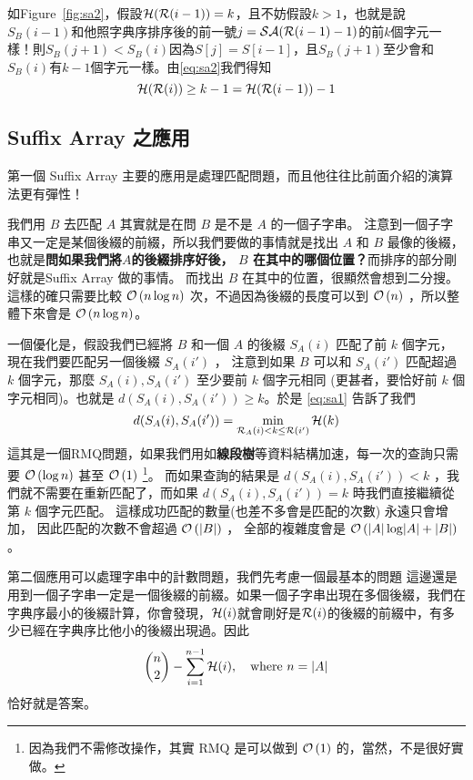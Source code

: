 \documentclass[a4paper,12pt]{book}
\begin{document}
如Figure~\ref{fig:sa2}，假設$\operatorname{\mathcal{H}}(\operatorname{\mathcal{R}}(i-1)) = k$，且不妨假設$k > 1$，也就是說$S_{B}(i-1)$和他照字典序排序後的前一號$j = \operatorname{\mathcal{SA}}(\operatorname{\mathcal{R}}(i-1)-1)$的前$k$個字元一樣！則$S_B(j+1) < S_B(i)$因為$S[j] = S[i-1]$，且$S_B(j+1)$至少會和$S_B(i)$有$k-1$個字元一樣。由\eqref{eq:sa2}我們得知
\[
  \operatorname{\mathcal{H}}(\operatorname{\mathcal{R}}(i)) \geq k - 1 = \operatorname{\mathcal{H}}(\operatorname{\mathcal{R}}(i-1)) - 1 
\]

\subsection{Suffix Array 之應用}
第一個 Suffix Array 主要的應用是處理匹配問題，而且他往往比前面介紹的演算法更有彈性！ 

我們用 $B$ 去匹配 $A$ 其實就是在問 $B$ 是不是 $A$ 的一個子字串。 注意到一個子字串又一定是某個後綴的前綴，所以我們要做的事情就是找出 $A$ 和 $B$ 最像的後綴，也就是{\bf 問如果我們將$A$的後綴排序好後， $B$ 在其中的哪個位置？}而排序的部分剛好就是Suffix Array 做的事情。 而找出 $B$ 在其中的位置，很顯然會想到二分搜。 這樣的確只需要比較 $\operatorname{\mathcal{O}}\left(n \log n\right)$ 次，不過因為後綴的長度可以到 $\operatorname{\mathcal{O}}\left(n\right)$ ，所以整體下來會是 $\operatorname{\mathcal{O}}\left(n \log n\right)$。

一個優化是，假設我們已經將 $B$ 和一個 $A$ 的後綴 $S_A(i)$ 匹配了前 $k$ 個字元， 現在我們要匹配另一個後綴 $S_A(i')$ ， 注意到如果 $B$ 可以和 $S_A(i')$ 匹配超過 $k$ 個字元，那麼 $S_A(i), S_A(i')$ 至少要前 $k$ 個字元相同 (更甚者，要恰好前 $k$ 個字元相同)。也就是 $d(S_A(i), S_A(i')) \geq k$。於是 \eqref{eq:sa1} 告訴了我們
\[ d(S_A(i), S_A(i')) = \min\limits_{\operatorname{\mathcal{R}}_A(i) < k \leq \operatorname{\mathcal{R}}(i')} \operatorname{\mathcal{H}}(k) \]
這其是一個RMQ問題，如果我們用如{\bf 線段樹}等資料結構加速，每一次的查詢只需要 $\operatorname{\mathcal{O}}\left(\log n\right)$  甚至 $\operatorname{\mathcal{O}}\left(1\right)$ \footnote{ 因為我們不需修改操作，其實 RMQ 是可以做到 $\operatorname{\mathcal{O}}\left(1\right)$ 的，當然，不是很好實做。 }。
而如果查詢的結果是 $d(S_A(i), S_A(i')) < k$ ，我們就不需要在重新匹配了，而如果 $d(S_A(i), S_A(i')) = k$ 時我們直接繼續從第 $k$ 個字元匹配。 這樣成功匹配的數量(也差不多會是匹配的次數) 永遠只會增加， 因此匹配的次數不會超過 $\operatorname{\mathcal{O}}\left(\lvert B \rvert\right)$ ， 全部的複雜度會是 $\operatorname{\mathcal{O}}\left( \lvert A \rvert \log \lvert A \rvert + \lvert B \rvert \right)$。

第二個應用可以處理字串中的計數問題，我們先考慮一個最基本的問題
這邊還是用到一個子字串一定是一個後綴的前綴。如果一個子字串出現在多個後綴，我們在字典序最小的後綴計算，你會發現，$\operatorname{\mathcal{H}}(i)$就會剛好是$\operatorname{\mathcal{R}}(i)$的後綴的前綴中，有多少已經在字典序比他小的後綴出現過。因此
\[ {n \choose 2} - \sum_{i=1}^{n-1} \operatorname{\mathcal{H}}(i) , \quad \text{where } n = \lvert A \rvert \]
恰好就是答案。
\end{document}
